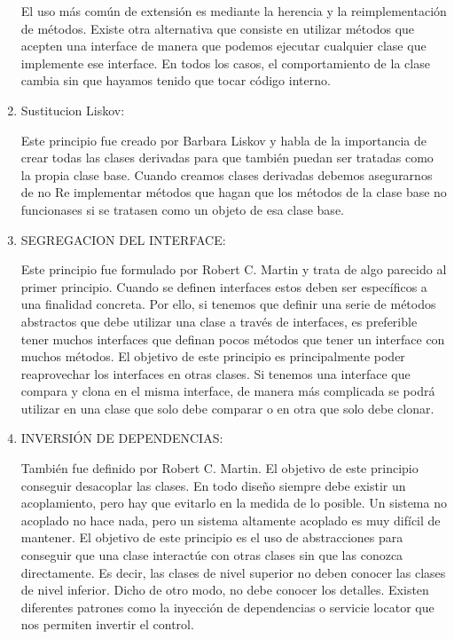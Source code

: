 \begin{enumerate}[1.]
El uso más común de extensión es mediante la herencia y la reimplementación de métodos. Existe otra alternativa que consiste en utilizar métodos que acepten una interface de manera que podemos ejecutar cualquier clase que implemente ese interface. En todos los casos, el comportamiento de la clase cambia sin que hayamos tenido que tocar código interno.


\item Sustitucion Liskov:

Este principio fue creado por Barbara Liskov y habla de la importancia de crear todas las clases derivadas para que también puedan ser tratadas como la propia clase base. Cuando creamos clases derivadas debemos asegurarnos de no Re implementar métodos que hagan que los métodos de la clase base no funcionases si se tratasen como un objeto de esa clase base.



\item SEGREGACION DEL INTERFACE:

Este principio fue formulado por Robert C. Martin y trata de algo parecido al primer principio. Cuando se definen interfaces estos deben ser específicos a una finalidad concreta. Por ello, si tenemos que definir una serie de métodos abstractos que debe utilizar una clase a través de interfaces, es preferible tener muchos interfaces que definan pocos métodos que tener un interface con muchos métodos.
El objetivo de este principio es principalmente poder reaprovechar los interfaces en otras clases. Si tenemos una interface que compara y clona en el misma interface, de manera más complicada se podrá utilizar en una clase que solo debe comparar o en otra que solo debe clonar.

\item INVERSIÓN DE DEPENDENCIAS:

También fue definido por Robert C. Martin. El objetivo de este principio conseguir desacoplar las clases. En todo diseño siempre debe existir un acoplamiento, pero hay que evitarlo en la medida de lo posible. Un sistema no acoplado no hace nada, pero un sistema altamente acoplado es muy difícil de mantener.
El objetivo de este principio es el uso de abstracciones para conseguir que una clase interactúe con otras clases sin que las conozca directamente. Es decir, las clases de nivel superior no deben conocer las clases de nivel inferior. Dicho de otro modo, no debe conocer los detalles. Existen diferentes patrones como la inyección de dependencias o servicie locator que nos permiten invertir el control.




\end{enumerate}
